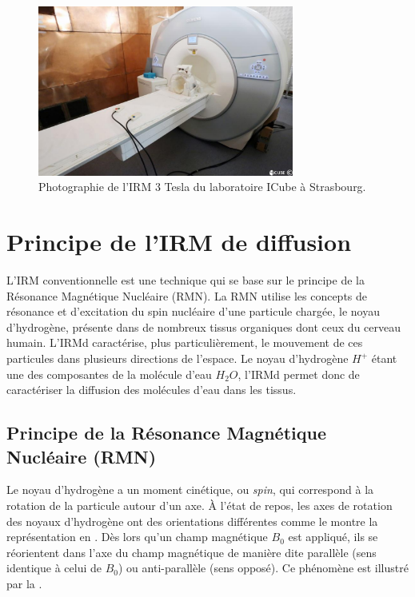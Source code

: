 \begin{figure}[h]
    \centering
    \includegraphics[width=0.75\textwidth]{Images/irm_3.pdf}
    \caption{\label{fig:irm} Photographie de l'IRM 3 Tesla du laboratoire ICube à Strasbourg.}
\end{figure}

\section{Principe de l'IRM de diffusion}
L'IRM conventionnelle est une technique qui se base sur le principe de la Résonance Magnétique Nucléaire (RMN).
La RMN utilise les concepts de résonance et d'excitation du spin nucléaire d'une particule chargée, 
le noyau d'hydrogène, présente dans de nombreux tissus organiques dont ceux du cerveau humain.
L'IRMd caractérise, plus particulièrement, le mouvement de ces particules dans plusieurs directions de l'espace.
Le noyau d'hydrogène $H^+$ étant une des composantes de la molécule d'eau $H_2O$,
l'IRMd permet donc de caractériser la diffusion des molécules d'eau dans les tissus.


\subsection{Principe de la Résonance Magnétique Nucléaire (RMN)}
Le noyau d'hydrogène a un moment cinétique, ou \textit{spin}, qui correspond à la rotation de la particule autour d'un axe.
À l'état de repos, les axes de rotation des noyaux d'hydrogène ont des orientations différentes 
comme le montre la représentation en .
Dès lors qu'un champ magnétique $B_0$ est appliqué, ils se réorientent dans l'axe du champ magnétique 
de manière dite \og parallèle \fg (sens identique à celui de $B_0$) ou \og anti-parallèle \fg (sens opposé).
Ce phénomène est illustré par la .

